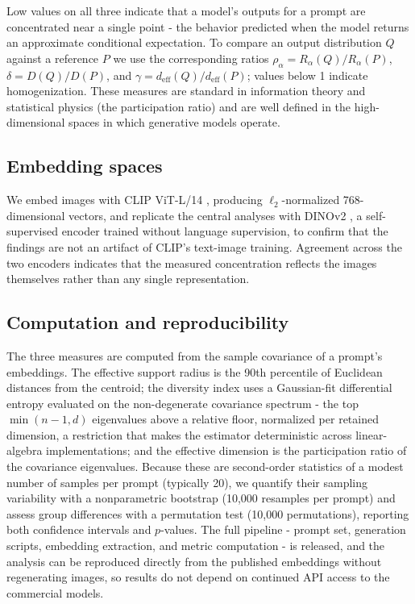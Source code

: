 \documentclass[11pt]{article}
\begin{document}
Low values on all three indicate that a model's outputs for a prompt are concentrated near a single point - the behavior predicted when the model returns an approximate conditional expectation. To compare an output distribution $Q$ against a reference $P$ we use the corresponding ratios $\rho_\alpha = R_\alpha(Q)/R_\alpha(P)$, $\delta = D(Q)/D(P)$, and $\gamma = d_{\mathrm{eff}}(Q)/d_{\mathrm{eff}}(P)$; values below 1 indicate homogenization. These measures are standard in information theory and statistical physics (the participation ratio) and are well defined in the high-dimensional spaces in which generative models operate.

\subsection{Embedding spaces}

We embed images with CLIP ViT-L/14 \citep{Radford2021}, producing $\ell_2$-normalized 768-dimensional vectors, and replicate the central analyses with DINOv2 \citep{Oquab2024}, a self-supervised encoder trained without language supervision, to confirm that the findings are not an artifact of CLIP's text-image training. Agreement across the two encoders indicates that the measured concentration reflects the images themselves rather than any single representation.

\subsection{Computation and reproducibility}

The three measures are computed from the sample covariance of a prompt's embeddings. The effective support radius is the 90th percentile of Euclidean distances from the centroid; the diversity index uses a Gaussian-fit differential entropy evaluated on the non-degenerate covariance spectrum - the top $\min(n-1, d)$ eigenvalues above a relative floor, normalized per retained dimension, a restriction that makes the estimator deterministic across linear-algebra implementations; and the effective dimension is the participation ratio of the covariance eigenvalues. Because these are second-order statistics of a modest number of samples per prompt (typically 20), we quantify their sampling variability with a nonparametric bootstrap (10,000 resamples per prompt) and assess group differences with a permutation test (10,000 permutations), reporting both confidence intervals and $p$-values. The full pipeline - prompt set, generation scripts, embedding extraction, and metric computation - is released, and the analysis can be reproduced directly from the published embeddings without regenerating images, so results do not depend on continued API access to the commercial models.
\end{document}
